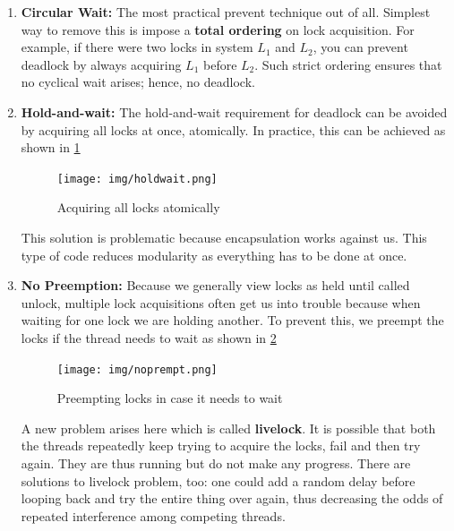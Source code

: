 \begin{enumerate}
    \item \textbf{Circular Wait:} The most practical prevent technique out of
        all. Simplest way to remove this is impose a \textbf{total ordering} on
        lock acquisition. For example, if there were two locks in system
        $L_1$ and $L_2$, you can prevent deadlock by always acquiring $L_1$
        before $L_2$. Such strict ordering ensures that no cyclical wait
        arises; hence, no deadlock.

    \item \textbf{Hold-and-wait:} The hold-and-wait requirement for deadlock
        can be avoided by acquiring all locks at once, atomically. In practice,
        this can be achieved as shown in \ref{holdwait}

        \begin{figure}[h!]
            \label{holdwait}
            \begin{center}
                \texttt{[image: img/holdwait.png]}
                \caption{Acquiring all locks atomically}
            \end{center}
        \end{figure}

        This solution is problematic because encapsulation works against us.
        This type of code reduces modularity as everything has to be done at 
        once.

    \item \textbf{No Preemption:} Because we generally view locks as held
        until called unlock, multiple lock acquisitions often get us into 
        trouble because when waiting for one lock we are holding another. To
        prevent this, we preempt the locks if the thread needs to wait as shown
        in \ref{noprempt}

        \begin{figure}[h!]
            \label{noprempt}
            \begin{center}
                \texttt{[image: img/noprempt.png]}
                \caption{Preempting locks in case it needs to wait}
            \end{center}
        \end{figure}

        A new problem arises here which is called \textbf{livelock}. It is
        possible that both the threads repeatedly keep trying to acquire the
        locks, fail and then try again. They are thus running but do not make
        any progress. There are solutions to livelock problem, too: one could
        add a random delay before looping back and try the entire thing over
        again, thus decreasing the odds of repeated interference among 
        competing threads.\\


\end{enumerate}
